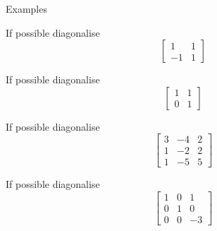 \documentclass{beamer}
\begin{document}
\begin{frame}{Examples}
\begin{example}
If possible diagonalise
\begin{equation*}
\left[
\begin{matrix}
1&1\\
-1&1
\end{matrix}
\right]
\end{equation*}
\end{example}
\begin{example}
If possible diagonalise
\begin{equation*}
\left[
\begin{matrix}
1&1\\
0&1
\end{matrix}
\right]
\end{equation*}
\end{example}
\begin{example}
If possible diagonalise
\[
\left[
\begin{matrix}
3&-4&2\\
1&-2&2\\
1&-5&5
\end{matrix}
\right]\]
\end{example}
\begin{example}
If possible diagonalise
\[
\left[
\begin{matrix}
1&0&1\\
0&1&0\\
0&0&-3
\end{matrix}
\right]\]
\end{example}
\end{frame}
\end{document}
